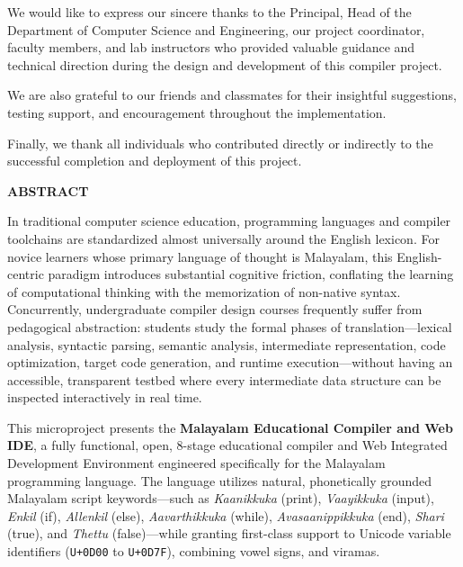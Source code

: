 \documentclass[12pt,a4paper]{report}
\begin{document}
\vspace{0.4cm}
\noindent We would like to express our sincere thanks to the Principal, Head of the Department of Computer Science and Engineering, our project coordinator, faculty members, and lab instructors who provided valuable guidance and technical direction during the design and development of this compiler project.

\vspace{0.4cm}
\noindent We are also grateful to our friends and classmates for their insightful suggestions, testing support, and encouragement throughout the implementation.

\vspace{0.4cm}
\noindent Finally, we thank all individuals who contributed directly or indirectly to the successful completion and deployment of this project.

\newpage
\begin{center}
    {\Large \textbf{ABSTRACT}}\\[1.0cm]
\end{center}

\noindent In traditional computer science education, programming languages and compiler toolchains are standardized almost universally around the English lexicon. For novice learners whose primary language of thought is Malayalam, this English-centric paradigm introduces substantial cognitive friction, conflating the learning of computational thinking with the memorization of non-native syntax. Concurrently, undergraduate compiler design courses frequently suffer from pedagogical abstraction: students study the formal phases of translation—lexical analysis, syntactic parsing, semantic analysis, intermediate representation, code optimization, target code generation, and runtime execution—without having an accessible, transparent testbed where every intermediate data structure can be inspected interactively in real time.

\vspace{0.3cm}
\noindent This microproject presents the \textbf{Malayalam Educational Compiler and Web IDE}, a fully functional, open, 8-stage educational compiler and Web Integrated Development Environment engineered specifically for the Malayalam programming language. The language utilizes natural, phonetically grounded Malayalam script keywords—such as \textit{Kaanikkuka} (print), \textit{Vaayikkuka} (input), \textit{Enkil} (if), \textit{Allenkil} (else), \textit{Aavarthikkuka} (while), \textit{Avasaanippikkuka} (end), \textit{Shari} (true), and \textit{Thettu} (false)—while granting first-class support to Unicode variable identifiers (\texttt{U+0D00} to \texttt{U+0D7F}), combining vowel signs, and viramas.
\end{document}
